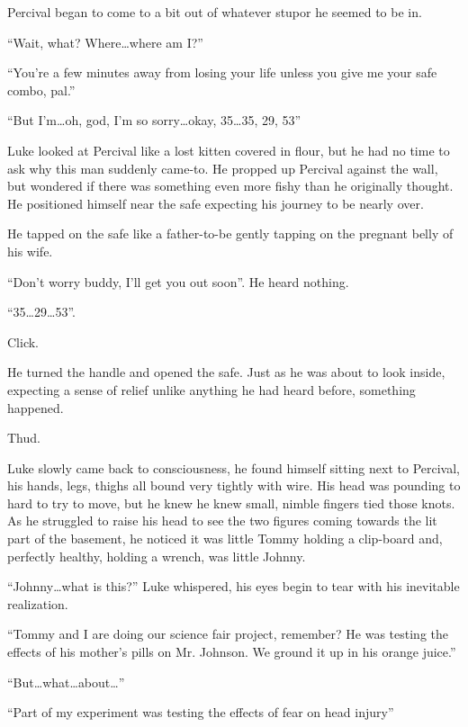 Percival began to come to a bit out of whatever stupor he seemed to
be in.

``Wait, what? Where{\ldots}where am I?''

``You're a few minutes away from losing your life unless
you give me your safe combo, pal.''

``But I'm{\ldots}oh, god, I'm so
sorry{\ldots}okay, 35{\ldots}35, 29, 53''



Luke looked at Percival like a lost kitten covered in flour, but he
had no time to ask why this man suddenly came-to. He propped up
Percival against the wall, but wondered if there was something even
more fishy than he originally thought. He positioned himself near
the safe expecting his journey to be nearly over.



He tapped on the safe like a father-to-be gently tapping on the
pregnant belly of his wife.

``Don't worry buddy, I'll get you out soon''.
He heard nothing.

``35{\ldots}29{\ldots}53''.

Click.

He turned the handle and opened the safe. Just as he was about to
look inside, expecting a sense of relief unlike anything he had
heard before, something happened.

Thud.



Luke slowly came back to consciousness, he found himself sitting
next to Percival, his hands, legs, thighs all bound very tightly
with wire. His head was pounding to hard to try to move, but he
knew he knew small, nimble fingers tied those knots. As he
struggled to raise his head to see the two figures coming towards
the lit part of the basement, he noticed it was little Tommy
holding a clip-board and, perfectly healthy, holding a wrench, was
little Johnny.



``Johnny{\ldots}what is this?'' Luke whispered, his eyes
begin to tear with his inevitable realization.

``Tommy and I are doing our science fair project, remember? He
was testing the effects of his mother's pills on Mr. Johnson.
We ground it up in his orange juice.''

``But{\ldots}what{\ldots}about{\ldots}''

``Part of my experiment was testing the effects of fear on
head injury''

